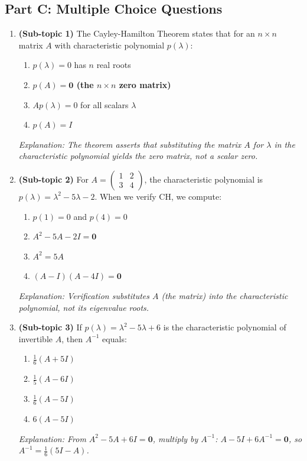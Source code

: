 \documentclass[12pt,a4paper]{article}
\begin{document}
\subsection*{Part C: Multiple Choice Questions}

\begin{enumerate}
  \item \textbf{(Sub-topic 1)} The Cayley-Hamilton Theorem states that for an $n\times n$ matrix $A$
        with characteristic polynomial $p(\lambda)$:
        \begin{enumerate}[label=\Alph*.]
          \item $p(\lambda) = 0$ has $n$ real roots
          \item \textbf{$p(A) = \mathbf{0}$ (the $n\times n$ zero matrix)}
          \item $A p(\lambda) = 0$ for all scalars $\lambda$
          \item $p(A) = I$
        \end{enumerate}
        \emph{Explanation: The theorem asserts that substituting the matrix $A$ for $\lambda$ in the
        characteristic polynomial yields the zero matrix, not a scalar zero.}

  \item \textbf{(Sub-topic 2)} For $A = \begin{pmatrix}1&2\\3&4\end{pmatrix}$, the characteristic
        polynomial is $p(\lambda)=\lambda^{2}-5\lambda-2$. When we verify CH, we compute:
        \begin{enumerate}[label=\Alph*.]
          \item $p(1) = 0$ and $p(4) = 0$
          \item \textbf{$A^{2} - 5A - 2I = \mathbf{0}$}
          \item $A^{2} = 5A$
          \item $(A-I)(A-4I) = \mathbf{0}$
        \end{enumerate}
        \emph{Explanation: Verification substitutes $A$ (the matrix) into the characteristic polynomial,
        not its eigenvalue roots.}

  \item \textbf{(Sub-topic 3)} If $p(\lambda)=\lambda^{2}-5\lambda+6$ is the characteristic
        polynomial of invertible $A$, then $A^{-1}$ equals:
        \begin{enumerate}[label=\Alph*.]
          \item $\tfrac{1}{6}(A+5I)$
          \item $\tfrac{1}{5}(A-6I)$
          \item \textbf{$\tfrac{1}{6}(A-5I)$}  \quad [i.e., $-\tfrac{1}{6}(A^{1} + (-5)I) = \tfrac{1}{6}(5I-A)$, equivalently $\tfrac{1}{6}(5I-A)$]
          \item $6(A-5I)$
        \end{enumerate}
        \emph{Explanation: From $A^{2}-5A+6I=\mathbf{0}$, multiply by $A^{-1}$:
        $A - 5I + 6A^{-1}=\mathbf{0}$, so $A^{-1}=\tfrac{1}{6}(5I-A)$.}


\end{enumerate}
\end{document}
